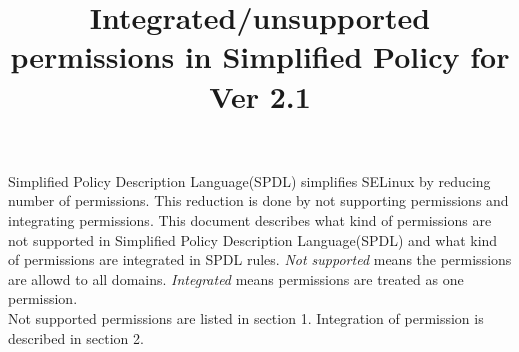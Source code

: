 \documentclass{article}
\title{Integrated/unsupported permissions in Simplified Policy for Ver 2.1}
\begin{document}
\def\labelenumi{(\theenumi)}
\maketitle
\tableofcontents
\newpage
Simplified Policy Description Language(SPDL) simplifies SELinux by
reducing number of permissions. This reduction is done by not supporting
permissions and integrating permissions.
This document describes what kind of permissions are not supported in
Simplified Policy Description Language(SPDL) and what kind of
permissions are integrated in SPDL rules.
{\it Not supported } means the permissions are allowd to all domains.
{\it Integrated } means permissions are treated as one permission.\\
Not supported permissions are listed in section 1. Integration of
permission is described in section 2.
\end{document}
